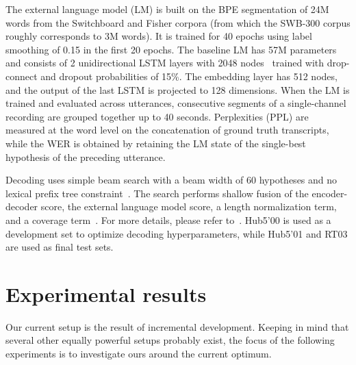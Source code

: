 \documentclass[a4paper]{article}
\begin{document}
The external language model (LM) is built on the BPE segmentation of 24M words from the Switchboard and Fisher corpora (from which the SWB-300 corpus roughly corresponds to 3M words).
It is trained for 40 epochs using label smoothing of 0.15 in the first 20 epochs.
The baseline LM has 57M parameters and consists of 2 unidirectional LSTM layers with 2048 nodes~\cite{Sundermeyer2012} trained with drop-connect and dropout probabilities of 15\%.
The embedding layer has 512 nodes, and the output of the last LSTM is projected to 128 dimensions.
When the LM is trained and evaluated across utterances, consecutive segments of a single-channel recording are grouped together up to 40 seconds.
Perplexities (PPL) are measured at the word level on the concatenation of ground truth transcripts, while the WER is obtained by retaining the LM state of the single-best hypothesis of the preceding utterance.



Decoding uses simple beam search with a beam width of 60 hypotheses and no lexical prefix tree constraint~\cite{Ney1992}.
The search performs shallow fusion of the encoder-decoder score, the external language model score, a length normalization term, and a coverage term~\cite{GulcehreFXCBLBS15,Hannun14,Tu2016}.
For more details, please refer to~\cite{Tuske2019}.
Hub5'00 is used as a development set to optimize decoding hyperparameters, while Hub5'01 and RT03  are used as final test sets.









\renewcommand{\baselinestretch}{0.93}\normalsize
\section{Experimental results}
Our current setup is the result of incremental development.
Keeping in mind that several other equally powerful setups probably exist, the focus of the following experiments is to investigate ours around the current optimum.
\end{document}
